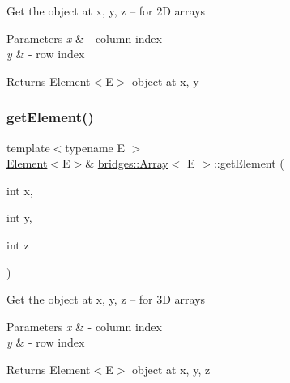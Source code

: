 Get the object at x, y, z -- for 2D arrays


\begin{DoxyParams}{Parameters}
{\em x} & -\/ column index \\
\hline
{\em y} & -\/ row index\\
\hline
\end{DoxyParams}
\begin{DoxyReturn}{Returns}
Element$<$\+E$>$ object at x, y 
\end{DoxyReturn}
\mbox{\label{classbridges_1_1_array_a7006eeac547c391cb7e8eb19c56ae9f6}} 
\subsubsection{\texorpdfstring{get\+Element()}{getElement()}\hspace{0.1cm}{\footnotesize\ttfamily [3/3]}}
{\footnotesize\ttfamily template$<$typename E $>$ \\
\mbox{\hyperlink{classbridges_1_1_element}{Element}}$<$E$>$\& \mbox{\hyperlink{classbridges_1_1_array}{bridges\+::\+Array}}$<$ E $>$\+::get\+Element (\begin{DoxyParamCaption}\item[{int}]{x,  }\item[{int}]{y,  }\item[{int}]{z }\end{DoxyParamCaption})\hspace{0.3cm}{\ttfamily [inline]}}

Get the object at x, y, z -- for 3D arrays


\begin{DoxyParams}{Parameters}
{\em x} & -\/ column index \\
\hline
{\em y} & -\/ row index\\
\hline
\end{DoxyParams}
\begin{DoxyReturn}{Returns}
Element$<$\+E$>$ object at x, y, z 
\end{DoxyReturn}
\mbox{\label{classbridges_1_1_array_a31edfcff05dd4102fee1840ee915319e}} 
